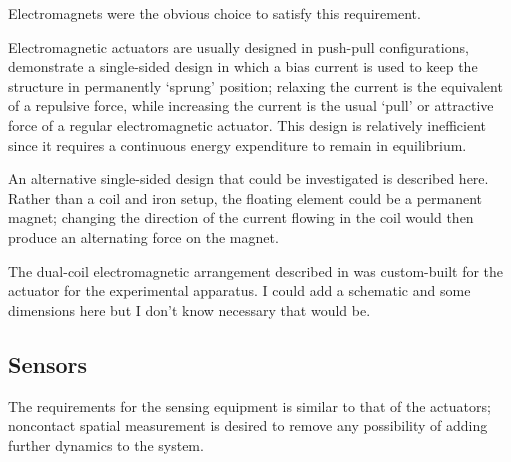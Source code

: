 Electromagnets were the obvious choice to satisfy this requirement.

Electromagnetic actuators are usually designed in push-pull configurations,
\textcite{nandi2009} demonstrate a single-sided design in which a bias current
is used to keep the structure in permanently `sprung' position; relaxing the
current is the equivalent of a repulsive force, while increasing the current
is the usual `pull' or attractive force of a regular electromagnetic actuator.
This design is relatively inefficient since it requires a continuous energy
expenditure to remain in equilibrium.

An alternative single-sided design that could be investigated is described
here. Rather than a coil and iron setup, the floating element could be a
permanent magnet; changing the direction of the current flowing in the coil
would then produce an alternating force on the magnet. 

The dual-coil electromagnetic arrangement described in  was
custom-built for the actuator for the experimental apparatus. I could add
a schematic and some dimensions here but I don't know necessary that would be.

\subsection{Sensors}

The requirements for the sensing equipment is similar to that
of the actuators; noncontact spatial measurement is desired
to remove any possibility of adding further dynamics to the system.

